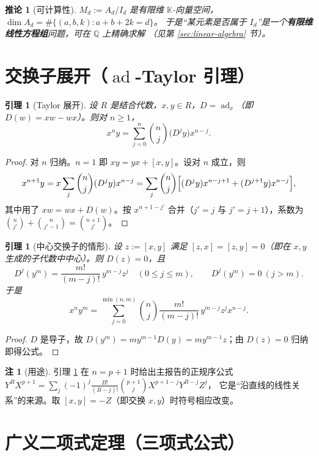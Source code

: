 \documentclass[11pt,UTF8]{ctexart}
\newtheorem{lemma}[theorem]{引理}
\newtheorem{corollary}[theorem]{推论}
\theoremstyle{definition}
\newtheorem{remark}[theorem]{注}
\newcommand{\ad}{\operatorname{ad}}
\newcommand{\Q}{\mathbb{Q}}
\newcommand{\K}{\mathbb{K}}
\begin{document}
\begin{corollary}[可计算性]
$M_d:=A_d/I_d$ 是有限维 $\K$-向量空间，$\dim A_d=\#\{(a,b,k): a+b+2k=d\}$。
于是“某元素是否属于 $I_d$”是一个\textbf{有限维线性方程组}问题，可在 $\Q$ 上精确求解
（见第 \ref{sec:linear-algebra} 节）。
\end{corollary}

\section{交换子展开（$\ad$-Taylor 引理）}\label{sec:adtaylor}

\begin{lemma}[Taylor 展开]\label{lem:taylor}
设 $R$ 是结合代数，$x,y\in R$，$D=\ad_x$（即 $D(w)=xw-wx$）。则对 $n\ge1$，
\[
x^{n}y=\sum_{j=0}^{n}\binom{n}{j}\bigl(D^{j}y\bigr)x^{n-j}.
\]
\end{lemma}

\begin{proof}
对 $n$ 归纳。$n=1$ 即 $xy=yx+[x,y]$。设对 $n$ 成立，则
\[
x^{n+1}y=x\sum_{j}\binom{n}{j}(D^{j}y)x^{n-j}
=\sum_{j}\binom{n}{j}\Bigl[(D^{j}y)x^{n-j+1}+(D^{j+1}y)x^{n-j}\Bigr],
\]
其中用了 $xw=wx+D(w)$。按 $x^{n+1-j'}$ 合并（$j'=j$ 与 $j'=j+1$），系数为
$\binom{n}{j'}+\binom{n}{j'-1}=\binom{n+1}{j'}$。
\end{proof}

\begin{lemma}[中心交换子的情形]\label{lem:central}
设 $z:=[x,y]$ 满足 $[z,x]=[z,y]=0$（即在 $x,y$ 生成的子代数中中心）。则 $D(z)=0$，且
\[
D^{j}(y^{m})=\frac{m!}{(m-j)!}\,y^{m-j}z^{j}\quad(0\le j\le m),\qquad D^{j}(y^m)=0\ (j>m).
\]
于是
\[
x^{n}y^{m}=\sum_{j=0}^{\min(n,m)}\binom{n}{j}\frac{m!}{(m-j)!}\,y^{m-j}z^{j}x^{n-j}.
\]
\end{lemma}

\begin{proof}
$D$ 是导子，故 $D(y^m)=m y^{m-1}D(y)=my^{m-1}z$；由 $D(z)=0$ 归纳即得公式。
\end{proof}

\begin{remark}[用途]
引理 \ref{lem:central} 在 $n=p+1$ 时给出主报告的正规序公式
$Y^BX^{p+1}=\sum_j(-1)^j\frac{B!}{(B-j)!}\binom{p+1}{j}X^{p+1-j}Y^{B-j}Z^j$，
它是“沿直线的线性关系”的来源。取 $[x,y]=-Z$（即交换 $x,y$）时符号相应改变。
\end{remark}

\section{广义二项式定理（三项式公式）}\label{sec:trinomial}
\end{document}
